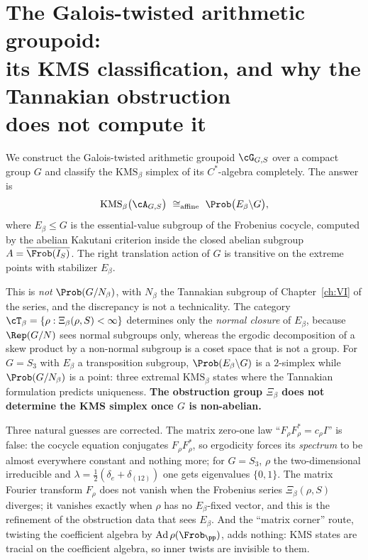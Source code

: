 \chapter[The Galois-twisted groupoid]{The Galois-twisted arithmetic groupoid:\\ its KMS classification, and why the Tannakian obstruction\\ does not compute it}\label{ch:VII}
\begin{summary}
We construct the Galois-twisted arithmetic groupoid $\cG_{G,S}$ over a compact group $G$ and
classify the $\mathrm{KMS}_\beta$ simplex of its $C^*$-algebra completely. The answer is
\[
\mathrm{KMS}_\beta\bigl(\cA_{G,S}\bigr)\ \cong_{\mathrm{affine}}\ \Prob\bigl(E_\beta\backslash G\bigr),
\]
where $E_\beta\le G$ is the essential-value subgroup of the Frobenius cocycle, computed by
the abelian Kakutani criterion inside the closed abelian subgroup
$A=\overline{\Frob(I_S)}$. The right translation action of $G$ is transitive on the extreme
points with stabilizer $E_\beta$.

This is \emph{not} $\Prob(G/N_\beta)$, with $N_\beta$ the Tannakian subgroup of Chapter~\ref{ch:VI}
of the series, and the discrepancy is not a technicality. The category
$\cT_\beta=\{\rho:\Xi_\beta(\rho,S)<\infty\}$ determines only the \emph{normal closure} of
$E_\beta$, because $\Rep(G/N)$ sees normal subgroups only, whereas the ergodic decomposition
of a skew product by a non-normal subgroup is a coset space that is not a group. For
$G=S_3$ with $E_\beta$ a transposition subgroup, $\Prob(E_\beta\backslash G)$ is a $2$-simplex
while $\Prob(G/N_\beta)$ is a point: three extremal $\mathrm{KMS}_\beta$ states where the
Tannakian formulation predicts uniqueness. \textbf{The obstruction group $\Xi_\beta$ does not
determine the KMS simplex once $G$ is non-abelian.}

Three natural guesses are corrected. The matrix zero-one law
``$F_\rho F_\rho^*=c_\rho I$'' is false: the cocycle equation conjugates $F_\rho F_\rho^*$, so
ergodicity forces its \emph{spectrum} to be almost everywhere constant and nothing more; for
$G=S_3$, $\rho$ the two-dimensional irreducible and $\lambda=\frac12(\delta_e+\delta_{(12)})$
one gets eigenvalues $\{0,1\}$. The matrix Fourier transform $F_\rho$ does not vanish when
the Frobenius series $\Xi_\beta(\rho,S)$ diverges; it vanishes exactly when $\rho$ has no
$E_\beta$-fixed vector, and this is the refinement of the obstruction data that sees
$E_\beta$. And the ``matrix corner'' route, twisting the coefficient algebra by
$\mathrm{Ad}\,\rho(\Frob_\pp)$, adds nothing: KMS states are tracial on the coefficient
algebra, so inner twists are invisible to them.


\end{summary}
